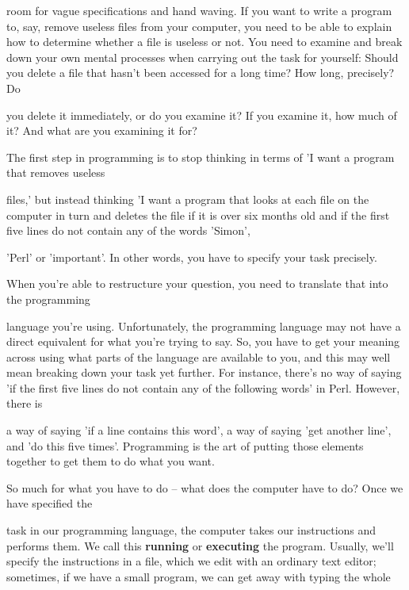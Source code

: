 \documentclass[a4paper,11pt]{book}
\begin{document}
\noindent room for vague specifications and hand waving. If you want to write a program to, say, remove useless files from your computer, you need to be able to explain how to determine whether a file is useless or not. You need to examine and break down your own mental processes when carrying out the task for yourself: Should you delete a file that hasn't been accessed for a long time? How long, precisely? Do

\noindent you delete it immediately, or do you examine it? If you examine it, how much of it? And what are you examining it for?

\noindent 

\noindent The first step in programming is to stop thinking in terms of 'I want a program that removes useless

\noindent files,' but instead thinking 'I want a program that looks at each file on the computer in turn and deletes the file if it is over six months old and if the first five lines do not contain any of the words 'Simon',

\noindent 'Perl' or 'important'. In other words, you have to specify your task precisely.

\noindent 

\noindent When you're able to restructure your question, you need to translate that into the programming

\noindent language you're using. Unfortunately, the programming language may not have a direct equivalent for what you're trying to say. So, you have to get your meaning across using what parts of the language are available to you, and this may well mean breaking down your task yet further. For instance, there's no way of saying 'if the first five lines do not contain any of the following words' in Perl. However, there is

\noindent a way of saying 'if a line contains this word', a way of saying 'get another line', and 'do this five times'. Programming is the art of putting those elements together to get them to do what you want.

\noindent 

\noindent So much for what you have to do -- what does the computer have to do? Once we have specified the

\noindent task in our programming language, the computer takes our instructions and performs them. We call this \textbf{running }or \textbf{executing }the program. Usually, we'll specify the instructions in a file, which we edit with an ordinary text editor; sometimes, if we have a small program, we can get away with typing the whole
\end{document}
